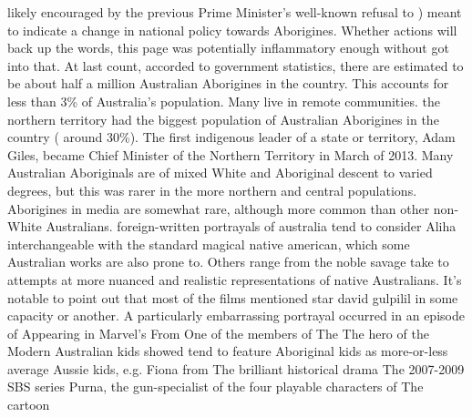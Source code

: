 \documentclass[12pt]{book}
\begin{document}
likely encouraged by the previous Prime Minister's well-known refusal to ) meant to indicate a change in national policy towards Aborigines. Whether actions will back up the words, this page was potentially inflammatory enough without got into that. At last count, accorded to government statistics, there are estimated to be about half a million Australian Aborigines in the country. This accounts for less than 3\% of Australia's population. Many live in remote communities. the northern territory had the biggest population of Australian Aborigines in the country ( around 30\%). The first indigenous leader of a state or territory, Adam Giles, became Chief Minister of the Northern Territory in March of 2013. Many Australian Aboriginals are of mixed White and Aboriginal descent to varied degrees, but this was rarer in the more northern and central populations. Aborigines in media are somewhat rare, although more common than other non-White Australians. foreign-written portrayals of australia tend to consider Aliha interchangeable with the standard magical native american, which some Australian works are also prone to. Others range from the noble savage take to attempts at more nuanced and realistic representations of native Australians. It's notable to point out that most of the films mentioned star david gulpilil in some capacity or another. A particularly embarrassing portrayal occurred in an episode of Appearing in Marvel's From One of the members of The The hero of the Modern Australian kids showed tend to feature Aboriginal kids as more-or-less average Aussie kids, e.g. Fiona from The brilliant historical drama The 2007-2009 SBS series Purna, the gun-specialist of the four playable characters of The cartoon
\end{document}
